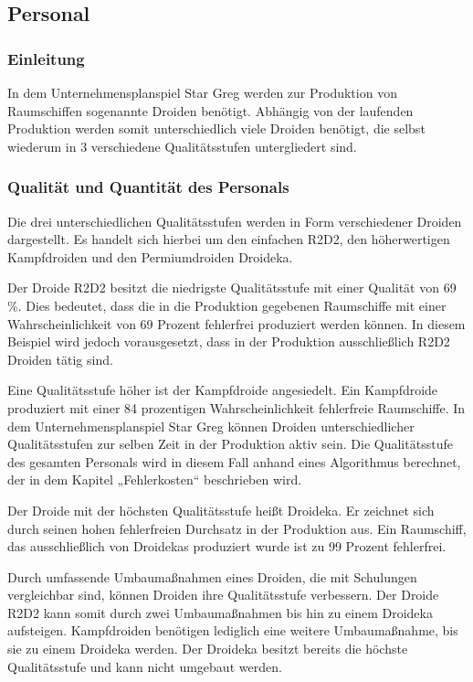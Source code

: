 \subsection{Personal}
\label{sub:Personal}
\subsubsection{Einleitung}
In dem Unternehmensplanspiel Star Greg werden zur Produktion von Raumschiffen sogenannte Droiden benötigt.   Abhängig von der laufenden Produktion  werden somit unterschiedlich viele Droiden benötigt, die selbst wiederum in 3 verschiedene Qualitätsstufen untergliedert sind.

\subsubsection{Qualität und Quantität des Personals}
Die drei unterschiedlichen Qualitätsstufen werden in Form verschiedener Droiden dargestellt. Es handelt sich hierbei um den einfachen R2D2, den höherwertigen Kampfdroiden und den Permiumdroiden Droideka.

Der Droide R2D2 besitzt die niedrigste Qualitätsstufe mit einer Qualität von 69 \%. Dies bedeutet, dass die in die Produktion gegebenen Raumschiffe mit einer Wahrscheinlichkeit von 69 Prozent fehlerfrei produziert werden können. In diesem Beispiel wird  jedoch vorausgesetzt, dass in der Produktion ausschließlich R2D2 Droiden tätig sind.  

Eine Qualitätsstufe höher ist der Kampfdroide angesiedelt. Ein Kampfdroide produziert mit einer 84 prozentigen Wahrscheinlichkeit fehlerfreie Raumschiffe. In dem Unternehmensplanspiel Star Greg können Droiden unterschiedlicher Qualitätsstufen zur selben Zeit in der Produktion aktiv sein. Die Qualitätsstufe des gesamten Personals wird in diesem Fall anhand eines Algorithmus berechnet, der in dem Kapitel „Fehlerkosten“ beschrieben wird.

Der Droide mit der höchsten Qualitätsstufe heißt Droideka. Er zeichnet sich durch seinen hohen fehlerfreien Durchsatz in der Produktion aus. Ein Raumschiff, das ausschließlich von Droidekas produziert wurde ist zu 99 Prozent fehlerfrei. 

Durch umfassende Umbaumaßnahmen eines Droiden, die mit Schulungen vergleichbar sind, können Droiden ihre Qualitätsstufe verbessern. Der Droide R2D2 kann somit durch zwei Umbaumaßnahmen bis hin zu einem Droideka aufsteigen.  Kampfdroiden benötigen lediglich eine weitere Umbaumaßnahme, bis sie zu einem Droideka werden. Der Droideka besitzt bereits die höchste Qualitätsstufe und kann nicht umgebaut werden.

